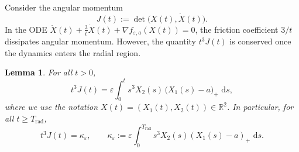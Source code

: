 \documentclass{article}
\newtheorem{proposition}[theorem]{Proposition}
\newtheorem{lemma}[theorem]{Lemma}
\theoremstyle{remark}
\newcommand{\dd}{\,\mathrm{d}}
\begin{document}




Consider the angular momentum
\[
    J (t):=\det\bigl(X (t),\dot X (t)\bigr).
\]
In the ODE $\ddot X(t)+\frac{3}{t}\dot X(t)+\nabla f_{\varepsilon,a}(X(t))=0$, the friction coefficient $3/t$ dissipates angular momentum. However, the quantity $t^3J (t)$ is conserved once the dynamics enters the radial region.


\begin{lemma}\label{lem:J-balance}
For all $t>0$,
\[
    t^3J (t)
  =
  \varepsilon \int_0^t s^3 X_{2}(s)\,\bigl(X_{1}(s)-a\bigr)_+\,\dd s,
\]
where we use the notation $X(t)=(X_1(t),X_2(t))\in \mathbb{R}^2$.
In particular, for all $t\ge T_\mathrm{rad}$,
\[
    t^3J (t)=\kappa_\varepsilon,
  \qquad
  \kappa_\varepsilon:=
  \varepsilon \int_0^{T_\mathrm{rad}} s^3 X_{2}(s)(X_{1}(s)-a)_+\,\dd s.
\]
\end{lemma}
\end{document}
